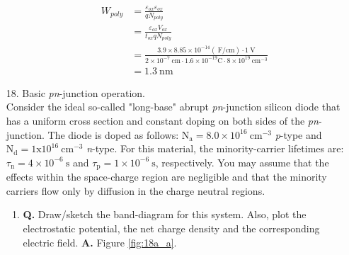 \documentclass[main.tex]{subfiles}
\begin{document}
\begin{enumerate}
\begin{enumerate}
        $$
        \begin{aligned}
        W_{poly} &= \frac{\varepsilon_{ox} \varepsilon_{ox}}{q N_{poly}}\\
        &= \frac{\varepsilon_{ox} V_{ox}}{t_{ox} q N_{poly}} \\
        &= \frac{3.9 \times 8.85 \times 10^{-14}(\mathrm{~F} / \mathrm{cm}) \cdot 1 \mathrm{~V}}{2 \times 10^{-7} \mathrm{~cm} \cdot 1.6 \times 10^{-19} \mathrm{C} \cdot 8 \times 10^{19} \mathrm{~cm}^{-3}} \\
        & =1.3 \mathrm{~nm}
        \end{aligned}
        $$
        
    \end{enumerate}
    


\item [18.] Basic \textit{pn}-junction operation.\\

Consider the ideal so-called "long-base" abrupt \textit{pn}-junction silicon diode that has a uniform cross section and constant doping on both sides of the \textit{pn}-junction. The diode is doped as follows: $\mathrm{N}_{\mathrm{a}}=8.0 \times 10^{16} \mathrm{~cm}^{-3}$ \textit{p}-type and $\mathrm{N}_{\mathrm{d}}=1 \mathrm{x} 10^{16} \mathrm{~cm}^{-3}$ \textit{n}-type. For this material, the minority-carrier lifetimes are: $\tau_{\mathrm{n}}=4 \times 10^{-6} \mathrm{~s}$ and $\tau_{\mathrm{p}}=1 \times 10^{-6} \mathrm{~s}$, respectively. You may assume that the effects within the space-charge region are negligible and that the minority carriers flow only by diffusion in the charge neutral regions.

    \begin{enumerate}
        \item \textbf{Q.} Draw/sketch the band-diagram for this system. Also, plot the electrostatic potential, the net charge density and the corresponding electric field. \textbf{A.} Figure \ref{fig:18a_a}.


\end{enumerate}
\end{enumerate}
\end{document}
